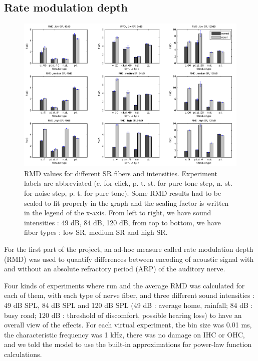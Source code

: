 
\subsection{Rate modulation depth}

\begin{figure}[ht]
	\centering
  \includegraphics[width=\textwidth]{images/rmds9.png} %
	\caption{RMD values for different SR fibers and intensities. Experiment labels are abbreviated 
	(c. for click, p. t. st. for pure tone step, n. st. for noise step, p. t. for pure tone).
	Some RMD results had to be scaled to fit properly in the graph and the scaling factor is written in the legend of the x-axis.
	From left to right, we have sound intensities : 49 dB, 84 dB, 120 dB,
	from top to bottom, we have fiber types : low SR, medium SR and high SR.}
	\label{fig:rmds}
\end{figure}

For the first part of the project, an ad-hoc measure called rate 
modulation depth (RMD) was used to quantify differences between encoding 
of acoustic signal with and without an absolute refractory period (ARP) of the auditory nerve.

Four kinds of experiments where run and the average RMD was calculated 
for each of them, 
with each type of nerve fiber, and three different sound intensities : 
49 dB SPL, 84 dB SPL and 120 dB SPL (49 dB : average home, rainfall; 84 dB : busy road; 120 dB : threshold of discomfort, possible hearing loss) 
to have an overall view of the effects.
For each virtual experiment, the bin size was 0.01 ms, the characteristic frequency was 1 kHz, 
there was no damage on IHC or OHC, and we told the model to use the built-in approximations 
for power-law function calculations.

